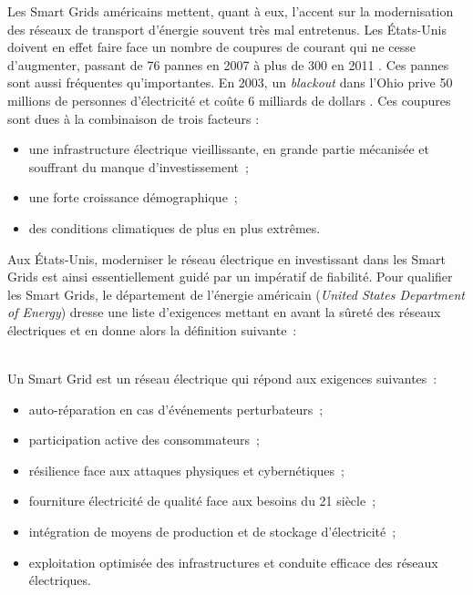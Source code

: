 Les Smart Grids américains mettent, quant à eux, l'accent sur la modernisation 
des réseaux de transport d'énergie souvent très mal entretenus. Les États-Unis 
doivent en effet faire face un nombre de coupures de courant qui ne cesse 
d'augmenter, passant de 76 pannes en 2007 à plus de 300 en 2011 \cite{detroit}. 
Ces pannes sont aussi fréquentes qu'importantes. En 2003, un \textit{blackout} 
dans l'Ohio prive 50 millions de personnes d'électricité et coûte 6 milliards 
de dollars \cite{andersson2005causes}. Ces coupures sont dues à la combinaison 
de trois facteurs \cite{outages}:

\begin{itemize}
    \item une infrastructure électrique vieillissante, en grande partie
    mécanisée et souffrant du manque d'investissement~;
    \item une forte croissance démographique~;
    \item des conditions climatiques de plus en plus extrêmes.
\end{itemize}

Aux États-Unis, moderniser le réseau électrique en investissant dans les Smart 
Grids est ainsi essentiellement guidé par un impératif de fiabilité. Pour 
qualifier les Smart Grids, le département de l'énergie américain (\textit{United 
States Department of Energy}) dresse une liste d'exigences mettant en avant la 
sûreté des réseaux électriques \cite{USDE} et en donne alors la définition suivante~:
\\\
\begin{definition}
Un Smart Grid est un réseau électrique qui répond aux exigences suivantes~:
    \begin{itemize}
        \item auto-réparation en cas d'événements perturbateurs~;
        \item participation active des consommateurs~; 
        \item résilience face aux attaques physiques et cybernétiques~;
        \item fourniture électricité de qualité face aux besoins du 21
              siècle~;
        \item intégration de moyens de production et de stockage d'électricité~;
        \item exploitation optimisée des infrastructures et conduite efficace des 
    réseaux électriques.
    \end{itemize}
\end{definition}

